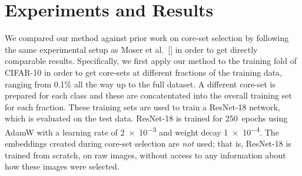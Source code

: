 \documentclass{article}
\begin{document}
%


\section{Experiments and Results}


We compared our method against prior work on core-set selection by
following the same experimental setup as
Moser et al.~[\citeyear{moser-shanbhag-etal:2025}] in order to get directly
comparable results. Specifically, we first apply our method to the
training fold of CIFAR-10 in order to get core-sets at different fractions
of the training data, ranging from 0.1\% all the way up to the full dataset.
A different core-set is prepared for each class and these are concatentated
into the overall training set for each fraction. These training sets
are used to train a ResNet-18 network, which is evaluated on the test data.
ResNet-18 is trained for 250~epochs %
using AdamW with a learning rate of \num{2e-3} and weight decay \num{1e-4}. 
The embeddings created during core-set selection are \emph{not}
used; that is, ResNet-18 is trained from scratch, on raw images, without
access to any information about how these images were selected.
\end{document}
